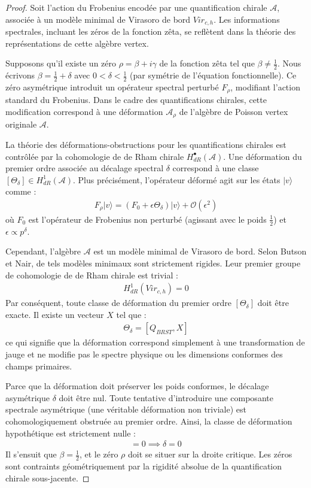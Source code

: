 \documentclass[
]{article}
\begin{document}
\begin{proof}
Soit l'action du Frobenius encodée par une quantification chirale $\mathcal{A}$, associée à un modèle minimal de Virasoro de bord $Vir_{c,h}$. Les informations spectrales, incluant les zéros de la fonction zêta, se reflètent dans la théorie des représentations de cette algèbre vertex.

Supposons qu'il existe un zéro $\rho = \beta + i\gamma$ de la fonction zêta tel que $\beta \neq \frac{1}{2}$. Nous écrivons $\beta = \frac{1}{2} + \delta$ avec $0 < \delta < \frac{1}{2}$ (par symétrie de l'équation fonctionnelle).
Ce zéro asymétrique introduit un opérateur spectral perturbé $F_\rho$, modifiant l'action standard du Frobenius.
Dans le cadre des quantifications chirales, cette modification correspond à une déformation $\mathcal{A}_\rho$ de l'algèbre de Poisson vertex originale $\mathcal{A}$.

La théorie des déformations-obstructions pour les quantifications chirales est contrôlée par la cohomologie de de Rham chirale $H^\bullet_{dR}(\mathcal{A})$. Une déformation du premier ordre associée au décalage spectral $\delta$ correspond à une classe $[\Theta_\delta] \in H^1_{dR}(\mathcal{A})$.
Plus précisément, l'opérateur déformé agit sur les états $| v \rangle$ comme :
\begin{align*}
F_\rho | v \rangle = (F_0 + \epsilon \Theta_\delta) | v \rangle + \mathcal{O}(\epsilon^2)
\end{align*}
où $F_0$ est l'opérateur de Frobenius non perturbé (agissant avec le poids $\frac{1}{2}$) et $\epsilon \propto p^\delta$.

Cependant, l'algèbre $\mathcal{A}$ est un modèle minimal de Virasoro de bord. Selon Butson et Nair, de tels modèles minimaux sont strictement rigides. Leur premier groupe de cohomologie de de Rham chirale est trivial :
\begin{align*}
H^1_{dR}(Vir_{c,h}) = 0
\end{align*}
Par conséquent, toute classe de déformation du premier ordre $[\Theta_\delta]$ doit être exacte. Il existe un vecteur $X$ tel que :
\begin{align*}
\Theta_\delta = [Q_{BRST}, X]
\end{align*}
ce qui signifie que la déformation correspond simplement à une transformation de jauge et ne modifie pas le spectre physique ou les dimensions conformes des champs primaires.

Parce que la déformation doit préserver les poids conformes, le décalage asymétrique $\delta$ doit être nul. Toute tentative d'introduire une composante spectrale asymétrique (une véritable déformation non triviale) est cohomologiquement obstruée au premier ordre.
Ainsi, la classe de déformation hypothétique est strictement nulle :
\begin{align*}
[\Theta_\delta] = 0 \implies \delta = 0
\end{align*}
Il s'ensuit que $\beta = \frac{1}{2}$, et le zéro $\rho$ doit se situer sur la droite critique. Les zéros sont contraints géométriquement par la rigidité absolue de la quantification chirale sous-jacente.
\end{proof}
\end{document}
